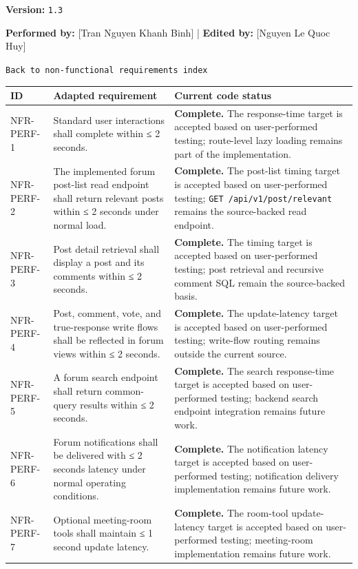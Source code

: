 \documentclass[12pt]{article}
\renewcommand{\baselinestretch}{1.5}
\begin{document}
\textbf{Version:} \texttt{1.3}
\par\medskip

\textbf{Performed by:} [Tran Nguyen Khanh Binh] | \textbf{Edited by:} [Nguyen Le Quoc Huy]
\par\medskip

\texttt{Back to non-functional requirements index}
\par\medskip

\begingroup
\small
\renewcommand{\baselinestretch}{1.0}\selectfont
\renewcommand{\arraystretch}{1.15}
\setlength{\tabcolsep}{6pt}
\begin{longtable}{|>{\raggedright\arraybackslash}p{}|>{\raggedright\arraybackslash}p{}|>{\raggedright\arraybackslash}p{}|}
\hline
\textbf{ID} & \textbf{Adapted requirement} & \textbf{Current code status} \\ \hline
\endhead
NFR-PERF-1 & Standard user interactions shall complete within ≤ 2 seconds. & \textbf{Complete.} The response-time target is accepted based on user-performed testing; route-level lazy loading remains part of the implementation. \\ \hline
NFR-PERF-2 & The implemented forum post-list read endpoint shall return relevant posts within ≤ 2 seconds under normal load. & \textbf{Complete.} The post-list timing target is accepted based on user-performed testing; \texttt{GET /api/v1/post/relevant} remains the source-backed read endpoint. \\ \hline
NFR-PERF-3 & Post detail retrieval shall display a post and its comments within ≤ 2 seconds. & \textbf{Complete.} The timing target is accepted based on user-performed testing; post retrieval and recursive comment SQL remain the source-backed basis. \\ \hline
NFR-PERF-4 & Post, comment, vote, and true-response write flows shall be reflected in forum views within ≤ 2 seconds. & \textbf{Complete.} The update-latency target is accepted based on user-performed testing; write-flow routing remains outside the current source. \\ \hline
NFR-PERF-5 & A forum search endpoint shall return common-query results within ≤ 2 seconds. & \textbf{Complete.} The search response-time target is accepted based on user-performed testing; backend search endpoint integration remains future work. \\ \hline
NFR-PERF-6 & Forum notifications shall be delivered with ≤ 2 seconds latency under normal operating conditions. & \textbf{Complete.} The notification latency target is accepted based on user-performed testing; notification delivery implementation remains future work. \\ \hline
NFR-PERF-7 & Optional meeting-room tools shall maintain ≤ 1 second update latency. & \textbf{Complete.} The room-tool update-latency target is accepted based on user-performed testing; meeting-room implementation remains future work. \\ \hline
\end{longtable}
\endgroup
\par\medskip
\end{document}

